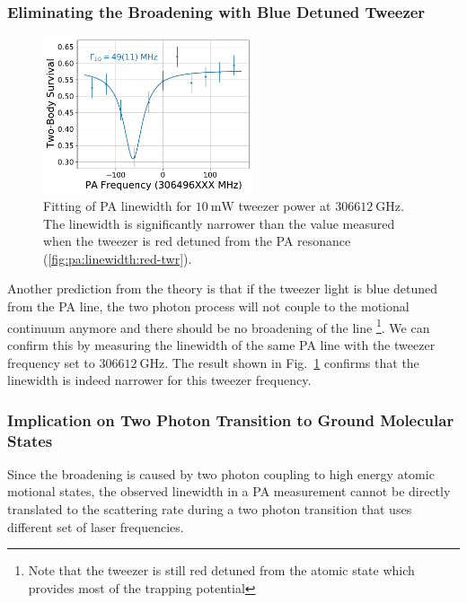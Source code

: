
\subsubsection{Eliminating the Broadening with Blue Detuned Tweezer}

\begin{figure}
  \centering
  \includegraphics[width=0.55\textwidth]{figures/pa_spectrum_v12_blue_10.pdf}
  \caption[PA linewidth for blue detuned tweezer]{
    Fitting of PA linewidth for $10~\mathrm{mW}$ tweezer power at $306612~\mathrm{GHz}$.
    The linewidth is significantly narrower than the value measured when the tweezer
    is red detuned from the PA resonance (\ref{fig:pa:linewidth:red-twr}).
    \label{fig:pa:linewidth:blue-twr}}
\end{figure}

Another prediction from the theory is that if the tweezer light is blue detuned from
the PA line, the two photon process will not couple to the motional continuum anymore
and there should be no broadening of the line
\footnote{Note that the tweezer is still red detuned from the atomic state which
  provides most of the trapping potential}.
We can confirm this by measuring the linewidth of the same PA line with the tweezer
frequency set to $306612~\mathrm{GHz}$.
The result shown in Fig.~\ref{fig:pa:linewidth:blue-twr}
confirms that the linewidth is indeed narrower for this tweezer frequency.

\subsubsection{Implication on Two Photon Transition to Ground Molecular States}
Since the broadening is caused by two photon coupling to high energy atomic motional states,
the observed linewidth in a PA measurement cannot be directly translated to
the scattering rate during a two photon transition that uses different set of laser frequencies.

